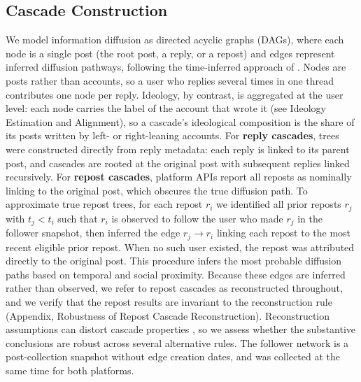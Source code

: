 \documentclass[letterpaper]{article} %
\newcommand{\rev}[1]{{\color{blue}#1}}
\begin{document}
\subsection{Cascade Construction}
We model information diffusion as directed acyclic graphs (DAGs), where \rev{each node is a single post (the root post, a reply, or a repost)} and edges represent inferred diffusion pathways, following the time-inferred approach of \citet{vosoughi_spread_2018}. \rev{Nodes are posts rather than accounts, so a user who replies several times in one thread contributes one node per reply. Ideology, by contrast, is aggregated at the user level: each node carries the label of the account that wrote it (see Ideology Estimation and Alignment), so a cascade's ideological composition is the share of its posts written by left- or right-leaning accounts.} For \textbf{reply cascades}, trees were constructed directly from reply metadata: each reply is linked to its parent post, and cascades are rooted at the original post with subsequent replies linked recursively. For \textbf{repost cascades}, platform APIs report all reposts as nominally linking to the original post, which obscures the true diffusion path. To approximate true repost trees, for each repost $r_i$ we identified all prior reposts $r_j$ with $t_j < t_i$ such that $r_i$ \rev{is observed to follow the user who made $r_j$ in the follower snapshot}, then inferred the edge $r_j \rightarrow r_i$ linking each repost to the most recent eligible prior repost. When no such user existed, the repost was attributed directly to the original post. This procedure infers the most probable diffusion paths based on temporal and social proximity. \rev{Because these edges are inferred rather than observed, we refer to repost cascades as reconstructed throughout, and we verify that the repost results are invariant to the reconstruction rule (Appendix, Robustness of Repost Cascade Reconstruction). Reconstruction assumptions can distort cascade properties \citep{deverna_cascade_2024}, so we assess whether the substantive conclusions are robust across several alternative rules. The follower network is a post-collection snapshot without edge creation dates, and was collected at the same time for both platforms.}
\end{document}
